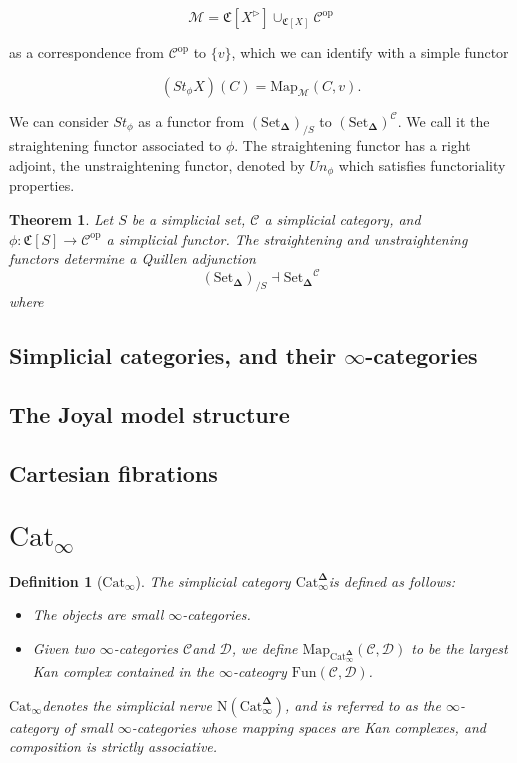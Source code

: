 \documentclass[12pt]{amsart}
\newcommand{\8}{\ensuremath{\infty}}
\newcommand{\C}{\ensuremath{\mathscr{C}}}
\newcommand{\D}{\ensuremath{\mathscr{D}}}
\newcommand{\SSet}{\ensuremath{\text{Set}_{\boldsymbol{\Delta}}}}
\newcommand{\Catinfdel}{\ensuremath{\text{Cat}^{\boldsymbol{\Delta}}_{\infty}}}
\newcommand{\Catinf}{\ensuremath{\text{Cat}_{\infty}}}
\newcommand{\op}[1]{\ensuremath{{#1}^{\text{op}}}}
\newcommand{\Map}{\ensuremath{\text{Map}}}
\newcommand{\Fun}{\ensuremath{\text{Fun}}}
\newtheorem{definition}{Definition}
\newtheorem{theorem}{Theorem}
\begin{document}
$$
  \mathcal{M} = \mathfrak{C}[X^{\triangleright}]\displaystyle \cup_{\mathfrak{C}[X]}\op\C
$$

as a correspondence from $\op\C$ to $\{v\}$, which we can identify with a simple functor

$$
  (St_\phi X)(C)=\text{Map}_\mathcal{M}(C, v).
$$

We can consider $St_\phi$ as a functor from $(\SSet)_{/S}$ to $(\SSet)^\C$. We call it the straightening functor associated to $\phi$.
The straightening functor has a right adjoint, the unstraightening functor, denoted by $Un_\phi$ which satisfies functoriality properties.

\begin{theorem}
  Let $S$ be a simplicial set, $\C$ a simplicial category, and $\phi: \mathfrak{C}[S] \rightarrow\op\C$ a simplicial functor. The straightening and unstraightening functors determine a Quillen adjunction
  $$
    (\SSet)_{/S}\dashv \SSet^\C
  $$
  where
\end{theorem}


\subsection{Simplicial categories, and their \texorpdfstring{$\8$-categories}{∞-categories}}
\subsection{The Joyal model structure}
\subsection{Cartesian fibrations}

\section{\texorpdfstring{\Catinf}{Cat∞}}

\begin{definition}[\Catinf]
  The simplicial category \Catinfdel is defined as follows:
  \begin{itemize}
    \item The objects are small \8-categories.
    \item Given two \8-categories \C and \D, we define $\Map_{\Catinfdel}(\C, \D)$ to be the largest Kan complex contained in the \8-cateogry $\Fun(\C, \D)$.
  \end{itemize}

  \Catinf denotes the simplicial nerve $\text{N}(\Catinfdel)$, and is referred to as the \8-category of small \8-categories whose mapping spaces are Kan complexes, and composition is strictly associative.
\end{definition}
\end{document}
